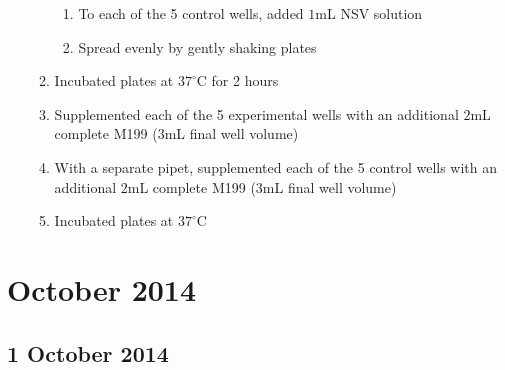 \begin{enumerate}
\begin{enumerate}
\begin{enumerate}
					\item To each of the 5 control wells, added $1$mL NSV solution
					\item Spread evenly by gently shaking plates
				\end{enumerate}
			\item Incubated plates at $37^{\circ}$C for 2 hours
			\item Supplemented each of the 5 experimental wells with an additional $2$mL complete M199 ($3$mL final well volume)
			\item With a separate pipet, supplemented each of the 5 control wells with an additional $2$mL complete M199 ($3$mL final well volume)
			\item Incubated plates at $37^{\circ}$C
		\end{enumerate}
\end{enumerate}

\section{October 2014}

\subsection*{1 October 2014}

